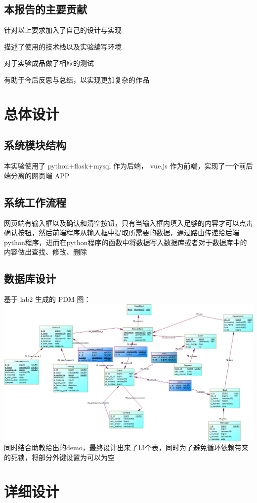 \documentclass{article}
\begin{document}
	\subsection{本报告的主要贡献}
	\par{针对以上要求加入了自己的设计与实现}
	\par{描述了使用的技术栈以及实验编写环境}
	\par{对于实验成品做了相应的测试}
	\par{有助于今后反思与总结，以实现更加复杂的作品}
	\section{总体设计}
	\subsection{系统模块结构}
	\par{本实验使用了 python+flask+mysql 作为后端， vue.js 作为前端，实现了一个前后端分离的网页端 APP}
	\subsection{系统工作流程}
	网页端有输入框以及确认和清空按钮，只有当输入框内填入足够的内容才可以点击确认按钮，然后前端程序从输入框中提取所需要的数据，通过路由传递给后端python程序，进而在python程序的函数中将数据写入数据库或者对于数据库中的内容做出查找、修改、删除
	\subsection{数据库设计}
	基于 lab2 生成的 PDM 图：\\
	\includegraphics*[scale=0.5]{PDM_look.png}\\
	同时结合助教给出的demo，最终设计出来了13个表，同时为了避免循环依赖带来的死锁，将部分外键设置为可以为空
	\section{详细设计}
\end{document}
